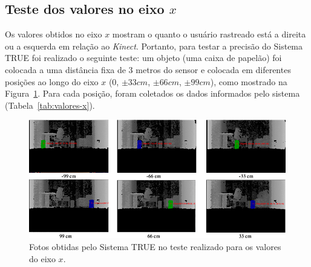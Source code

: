 \subsection{Teste dos valores no eixo $\displaystyle x$}

	Os valores obtidos no eixo $\displaystyle x$ mostram o quanto o usuário rastreado está a direita ou a esquerda em relação ao \textit{Kinect}. Portanto, para testar a precisão do Sistema TRUE foi realizado o seguinte teste: um objeto (uma caixa de papelão) foi colocada a uma distância fixa de 3 metros do sensor e colocada em diferentes posições ao longo do eixo $\displaystyle x$ (0, $\displaystyle \pm33 cm$, $\displaystyle \pm66 cm$, $\displaystyle \pm99 cm$), como mostrado na Figura~\ref{fig:eixox-imgs}. Para cada posição, foram coletados os dados informados pelo sistema (Tabela~\ref{tab:valores-x}). 


	\begin{figure}[htb]
		\begin{center}
			\includegraphics[scale=0.5]{figuras/5.Testes/eixox-imgs2.png}
		\end{center}
		\caption{Fotos obtidas pelo Sistema TRUE no teste realizado para os valores do eixo $\displaystyle x$.}
		\label{fig:eixox-imgs}
	\end{figure}

